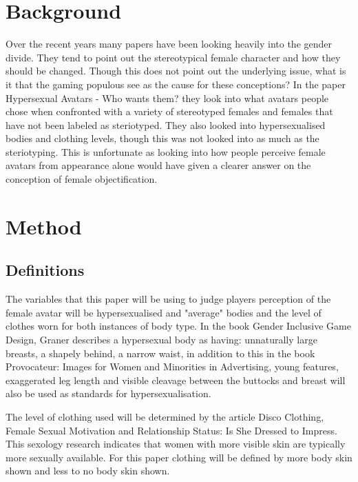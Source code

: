 \documentclass{scrartcl}
\begin{document}
\section{Background}

Over the recent years many papers have been looking heavily into the gender divide. They tend to point out the stereotypical female character and how they should be changed\cite{LaraPhenomenon,MirrorSexist,GenderSteriotype}. Though this does not point out the underlying issue, what is it that the gaming populous see as the cause for these conceptions? In the paper Hypersexual Avatars - Who wants them?\cite{WhowantsThem} they look into what avatars people chose when confronted with a variety of stereotyped females and females that have not been labeled as steriotyped. They also looked into hypersexualised bodies and clothing levels, though this was not looked into as much as the steriotyping. This is unfortunate as looking into how people perceive female avatars from appearance alone would have given a clearer answer on the conception of female objectification. 

\section{Method}

\subsection{Definitions}

The variables that this paper will be using to judge players perception of the female avatar will be hypersexualised and "average" bodies and the level of clothes worn for both instances of body type.
\newline
In the book Gender Inclusive Game Design\cite{Graner}, Graner describes a hypersexual body as having: unnaturally large breasts, a shapely behind, a narrow waist, in addition to this in the book Provocateur: Images for Women and Minorities in Advertising\cite{WomenAds}, young features, exaggerated leg length and visible cleavage between the buttocks and breast will also be used as standards for hypersexualisation.

The level of clothing used will be determined by the article Disco Clothing, Female Sexual Motivation and Relationship Status: Is She Dressed to Impress\cite{SkinExpose}. This sexology research indicates that women with more visible skin are typically more sexually available. For this paper clothing will be defined by more body skin shown and less to no body skin shown.
\end{document}
